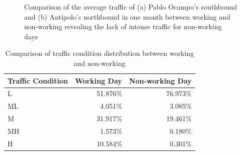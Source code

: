 \begin{figure}[h] 
\centering
    \centering
      \captionsetup{justification=centering}
    \hfill
    \caption{Comparison of the average traffic of (a) Pablo Ocampo’s southbound and (b) Antipolo’s northbound  in one month between working and non-working revealing the lack of intense traffic for non-working days}

    \label{figure_workingday_comparison}
\end{figure}



\begin{table}[h]
\centering
\caption{Comparison of traffic condition distribution between working and non-working}
\label{table_traffic_cond_workingday}
\begin{tabular}{|l|r|r|}
\hline
\textbf{Traffic Condition} & \textbf{Working Day} & \textbf{Non-working Day} \\ \hline
L                          & 51.876\%             & 76.973\%                 \\ \hline
ML                         & 4.051\%              & 3.085\%                  \\ \hline
M                          & 31.917\%             & 19.461\%                 \\ \hline
MH                         & 1.573\%              & 0.180\%                  \\ \hline
H                          & 10.584\%             & 0.301\%                  \\ \hline
\end{tabular}
\end{table}

